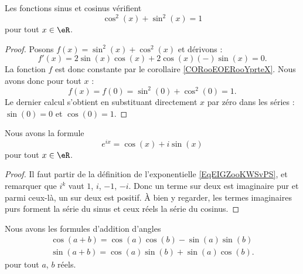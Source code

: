\begin{lemma}
    Les fonctions sinus et cosinus vérifient
    \begin{equation}
        \cos^2(x)+\sin^2(x)=1
    \end{equation}
    pour tout \( x\in \eR\).
\end{lemma}

\begin{proof}
    Posons \( f(x)=\sin^2(x)+\cos^2(x)\) et dérivons :
    \begin{equation}
        f'(x)=2\sin(x)\cos(x)+2\cos(x)(-)\sin(x)=0.
    \end{equation}
    La fonction \( f\) est donc constante par le corollaire \ref{CORooEOERooYprteX}. Nous avons donc pour tout \( x\) :
    \begin{equation}
        f(x)=f(0)=\sin^2(0)+\cos^2(0)=1.
    \end{equation}
    Le dernier calcul s'obtient en substituant directement \( x\) par zéro dans les séries : \( \sin(0)=0\) et \( \cos(0)=1\).
\end{proof}

\begin{lemma}
    Nous avons la formule
    \begin{equation}        \label{EQooRVPJooTMwNTU}
        e^{ix}=\cos(x)+i\sin(x)
    \end{equation}
    pour tout \( x\in \eR\).
\end{lemma}

\begin{proof}
    Il faut partir de la définition de l'exponentielle \eqref{EqEIGZooKWSvPS}, et remarquer que \( i^k\) vaut \( 1\), \( i\), \( -1\), \( -i\). Donc un terme sur deux est imaginaire pur et parmi ceux-là, un sur deux est positif. À bien y regarder, les termes imaginaires purs forment la série du sinus et ceux réels la série du cosinus.
\end{proof}

\begin{lemma}
    Nous avons les formules d'addition d'angles
    \begin{subequations}
        \begin{align}
            \cos(a+b)=\cos(a)\cos(b)-\sin(a)\sin(b)\\
            \sin(a+b)=\cos(a)\sin(b)+\sin(a)\cos(b).
        \end{align}
    \end{subequations}
    pour tout \( a\), \( b\) réels.
\end{lemma}

